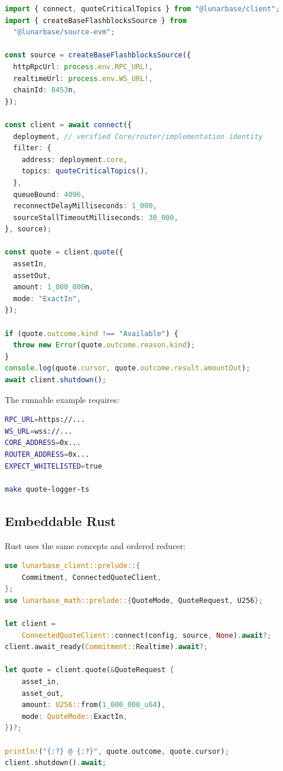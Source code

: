 \documentclass[11pt,a4paper]{article}
\begin{document}
\begin{lstlisting}[language=TypeScript]
import { connect, quoteCriticalTopics } from "@lunarbase/client";
import { createBaseFlashblocksSource } from
  "@lunarbase/source-evm";

const source = createBaseFlashblocksSource({
  httpRpcUrl: process.env.RPC_URL!,
  realtimeUrl: process.env.WS_URL!,
  chainId: 8453n,
});

const client = await connect({
  deployment, // verified Core/router/implementation identity
  filter: {
    address: deployment.core,
    topics: quoteCriticalTopics(),
  },
  queueBound: 4096,
  reconnectDelayMilliseconds: 1_000,
  sourceStallTimeoutMilliseconds: 30_000,
}, source);

const quote = client.quote({
  assetIn,
  assetOut,
  amount: 1_000_000n,
  mode: "ExactIn",
});

if (quote.outcome.kind !== "Available") {
  throw new Error(quote.outcome.reason.kind);
}
console.log(quote.cursor, quote.outcome.result.amountOut);
await client.shutdown();
\end{lstlisting}

The runnable example requires:

\begin{lstlisting}[language=bash]
RPC_URL=https://...
WS_URL=wss://...
CORE_ADDRESS=0x...
ROUTER_ADDRESS=0x...
EXPECT_WHITELISTED=true

make quote-logger-ts
\end{lstlisting}

\subsection{Embeddable Rust}

Rust uses the same concepts and ordered reducer:

\begin{lstlisting}[language=Rust]
use lunarbase_client::prelude::{
    Commitment, ConnectedQuoteClient,
};
use lunarbase_math::prelude::{QuoteMode, QuoteRequest, U256};

let client =
    ConnectedQuoteClient::connect(config, source, None).await?;
client.await_ready(Commitment::Realtime).await?;

let quote = client.quote(&QuoteRequest {
    asset_in,
    asset_out,
    amount: U256::from(1_000_000_u64),
    mode: QuoteMode::ExactIn,
})?;

println!("{:?} @ {:?}", quote.outcome, quote.cursor);
client.shutdown().await;
\end{lstlisting}
\end{document}
